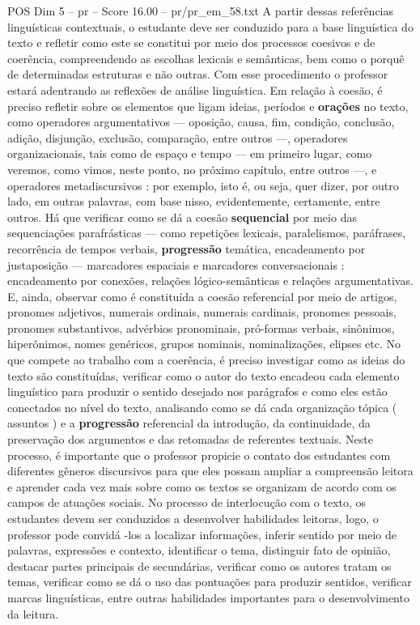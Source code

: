 \begin{textsample}{POS Dim 5 – pr – Score 16.00 – pr/pr\_em\_58.txt}
A partir dessas referências linguísticas contextuais, o estudante deve ser conduzido para a base linguística do texto e refletir como este se constitui por meio dos processos coesivos e de coerência, compreendendo as escolhas lexicais e semânticas, bem como o porquê de determinadas estruturas e não outras.
Com esse procedimento o professor estará adentrando as reflexões de análise linguística.
Em relação à coesão, é preciso refletir sobre os elementos que ligam ideias, períodos e \textbf{orações} no texto, como operadores argumentativos — oposição, causa, fim, condição, conclusão, adição, disjunção, exclusão, comparação, entre outros —, operadores organizacionais, tais como de espaço e tempo — em primeiro lugar, como veremos, como vimos, neste ponto, no próximo capítulo, entre outros —, e operadores metadiscursivos : por exemplo, isto é, ou seja, quer dizer, por outro lado, em outras palavras, com base nisso, evidentemente, certamente, entre outros.
Há que verificar como se dá a coesão \textbf{sequencial} por meio das sequenciações parafrásticas — como repetições lexicais, paralelismos, paráfrases, recorrência de tempos verbais, \textbf{progressão} temática, encadeamento por justaposição — marcadores espaciais e marcadores conversacionais : encadeamento por conexões, relações lógico-semânticas e relações argumentativas.
E, ainda, observar como é constituída a coesão referencial por meio de artigos, pronomes adjetivos, numerais ordinais, numerais cardinais, pronomes pessoais, pronomes substantivos, advérbios pronominais, pró-formas verbais, sinônimos, hiperônimos, nomes genéricos, grupos nominais, nominalizações, elipses etc.
No que compete ao trabalho com a coerência, é preciso investigar como as ideias do texto são constituídas, verificar como o autor do texto encadeou cada elemento linguístico para produzir o sentido desejado nos parágrafos e como eles estão conectados no nível do texto, analisando como se dá cada organização tópica ( assuntos ) e a \textbf{progressão} referencial da introdução, da continuidade, da preservação dos argumentos e das retomadas de referentes textuais.
Neste processo, é importante que o professor propicie o contato dos estudantes com diferentes gêneros discursivos para que eles possam ampliar a compreensão leitora e aprender cada vez mais sobre como os textos se organizam de acordo com os campos de atuações sociais.
No processo de interlocução com o texto, os estudantes devem ser conduzidos a desenvolver habilidades leitoras, logo, o professor pode convidá -los a localizar informações, inferir sentido por meio de palavras, expressões e contexto, identificar o tema, distinguir fato de opinião, destacar partes principais de secundárias, verificar como os autores tratam os temas, verificar como se dá o uso das pontuações para produzir sentidos, verificar marcas linguísticas, entre outras habilidades importantes para o desenvolvimento da leitura.

\end{textsample}

